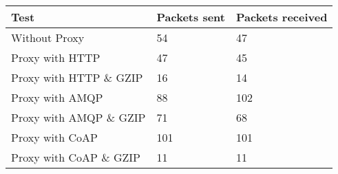 \begin{tabular}{|l|l|l|}
\hline
\textbf{Test} & \textbf{Packets sent} & \textbf{Packets received} \\ \hline
Without Proxy                    &54         & 47        \\ \hline 
Proxy with HTTP                  &47         & 45        \\ \hline 
Proxy with HTTP \& GZIP          &16         & 14        \\ \hline 
Proxy with AMQP                  &88         & 102       \\ \hline 
Proxy with AMQP \& GZIP          &71         & 68        \\ \hline 
Proxy with CoAP                  &101        & 101       \\ \hline 
Proxy with CoAP \& GZIP          &11         & 11        \\ \hline 
\end{tabular}